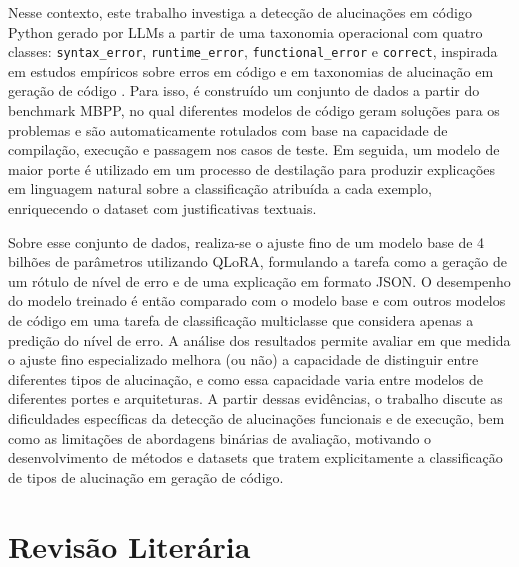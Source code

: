 \documentclass[conference]{IEEEtran}
\begin{document}
Nesse contexto, este trabalho investiga a detecção de alucinações em código Python gerado por LLMs a partir de uma taxonomia operacional com quatro classes: \texttt{syntax\_error}, \texttt{runtime\_error}, \texttt{functional\_error} e \texttt{correct}, inspirada em estudos empíricos sobre erros em código e em taxonomias de alucinação em geração de código \cite{2407.06153,2504.20799}. Para isso, é construído um conjunto de dados a partir do benchmark MBPP, no qual diferentes modelos de código geram soluções para os problemas e são automaticamente rotulados com base na capacidade de compilação, execução e passagem nos casos de teste. Em seguida, um modelo de maior porte é utilizado em um processo de destilação para produzir explicações em linguagem natural sobre a classificação atribuída a cada exemplo, enriquecendo o dataset com justificativas textuais.

Sobre esse conjunto de dados, realiza-se o ajuste fino de um modelo base de 4 bilhões de parâmetros utilizando QLoRA, formulando a tarefa como a geração de um rótulo de nível de erro e de uma explicação em formato JSON. O desempenho do modelo treinado é então comparado com o modelo base e com outros modelos de código em uma tarefa de classificação multiclasse que considera apenas a predição do nível de erro. A análise dos resultados permite avaliar em que medida o ajuste fino especializado melhora (ou não) a capacidade de distinguir entre diferentes tipos de alucinação, e como essa capacidade varia entre modelos de diferentes portes e arquiteturas. A partir dessas evidências, o trabalho discute as dificuldades específicas da detecção de alucinações funcionais e de execução, bem como as limitações de abordagens binárias de avaliação, motivando o desenvolvimento de métodos e datasets que tratem explicitamente a classificação de tipos de alucinação em geração de código.

\section{Revisão Literária}
\end{document}

